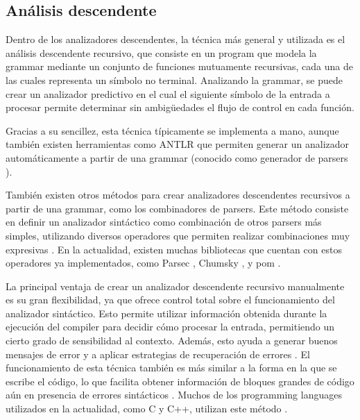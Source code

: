 \subsection{Análisis descendente}

Dentro de los analizadores descendentes, la técnica más general y utilizada es
el análisis descendente recursivo, que consiste en un \gls{program} que modela la
\gls{grammar} mediante un conjunto de funciones mutuamente recursivas, cada una
de las cuales representa un símbolo no terminal. Analizando la \gls{grammar}, se
puede crear un analizador predictivo en el cual el siguiente símbolo de la
entrada a procesar permite determinar sin ambigüedades el flujo de control en
cada función. \parencite{dragon-book}

Gracias a su sencillez, esta técnica típicamente se implementa a mano, aunque
también existen herramientas como ANTLR \parencite{ANTLR} que permiten generar
un analizador automáticamente a partir de una \gls{grammar} (conocido como
generador de \glspl{parser} \parencite{dragon-book}).

También existen otros métodos para crear analizadores descendentes
recursivos a partir de una \gls{grammar}, como los combinadores de
\glspl{parser}. Este método consiste en definir un analizador sintáctico como
combinación de otros \glspl{parser} más simples, utilizando diversos operadores
que permiten realizar combinaciones muy expresivas
\parencite{parser-combinators}. En la actualidad, existen muchas bibliotecas que
cuentan con estos operadores ya implementados, como Parsec \parencite{parsec}, Chumsky
\parencite{chumsky}, y pom \parencite{pom}.

La principal ventaja de crear un analizador descendente recursivo manualmente es
su gran flexibilidad, ya que ofrece control total sobre el funcionamiento del
analizador sintáctico. Esto permite utilizar información obtenida durante la
ejecución del \gls{compiler} para decidir cómo procesar la entrada, permitiendo
un cierto grado de sensibilidad al contexto. Además, esto ayuda a generar buenos
mensajes de error y a aplicar estrategias de recuperación de errores
\parencite{errors-clang}. El funcionamiento de esta técnica también es más
similar a la forma en la que se escribe el código, lo que facilita obtener
información de bloques grandes de código aún en presencia de errores sintácticos
\parencite{resilient-LL-parsing}. Muchos de los \glspl{programming language}
utilizados en la actualidad, como C y C++, utilizan este método
\parencite{parser-types-survey}.

